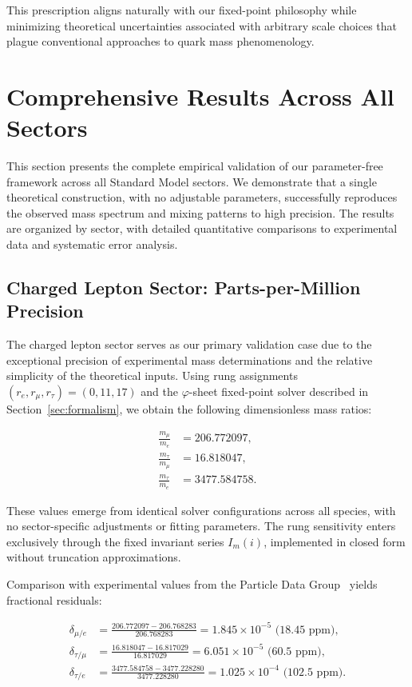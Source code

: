 \documentclass[%
amsmath,amssymb,
aps,
prb,
floatfix,
twocolumn
]{revtex4-2}
\begin{document}
This prescription aligns naturally with our fixed-point philosophy while minimizing theoretical uncertainties associated with arbitrary scale choices that plague conventional approaches to quark mass phenomenology.

\section{Comprehensive Results Across All Sectors}
\label{sec:results}

This section presents the complete empirical validation of our parameter-free framework across all Standard Model sectors. We demonstrate that a single theoretical construction, with no adjustable parameters, successfully reproduces the observed mass spectrum and mixing patterns to high precision. The results are organized by sector, with detailed quantitative comparisons to experimental data and systematic error analysis.

\subsection{Charged Lepton Sector: Parts-per-Million Precision}
\label{subsec:lepton_results}

The charged lepton sector serves as our primary validation case due to the exceptional precision of experimental mass determinations and the relative simplicity of the theoretical inputs. Using rung assignments $(r_e, r_\mu, r_\tau) = (0, 11, 17)$ and the $\varphi$-sheet fixed-point solver described in Section~\ref{sec:formalism}, we obtain the following dimensionless mass ratios:

\begin{align}
\frac{m_\mu}{m_e} &= 206.772097, \label{eq:mu_e_ratio} \\
\frac{m_\tau}{m_\mu} &= 16.818047, \label{eq:tau_mu_ratio} \\
\frac{m_\tau}{m_e} &= 3477.584758. \label{eq:tau_e_ratio}
\end{align}

These values emerge from identical solver configurations across all species, with no sector-specific adjustments or fitting parameters. The rung sensitivity enters exclusively through the fixed invariant series $I_m(i)$, implemented in closed form without truncation approximations.

Comparison with experimental values from the Particle Data Group~\cite{PDG2024} yields fractional residuals:

\begin{align}
\delta_{\mu/e} &= \frac{206.772097 - 206.768283}{206.768283} = 1.845 \times 10^{-5} \text{ (18.45 ppm)}, \\
\delta_{\tau/\mu} &= \frac{16.818047 - 16.817029}{16.817029} = 6.051 \times 10^{-5} \text{ (60.5 ppm)}, \\
\delta_{\tau/e} &= \frac{3477.584758 - 3477.228280}{3477.228280} = 1.025 \times 10^{-4} \text{ (102.5 ppm)}.
\end{align}
\end{document}
